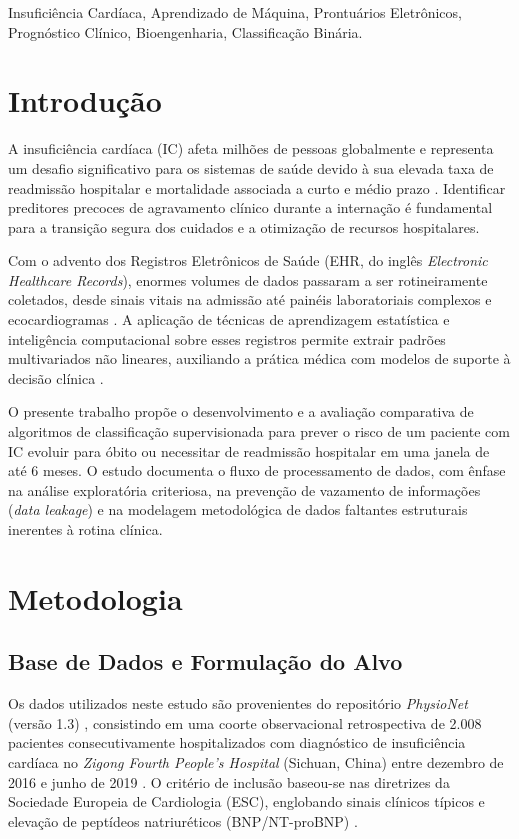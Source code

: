 \documentclass[conference]{IEEEtran}
\begin{document}
\begin{IEEEkeywords}
Insuficiência Cardíaca, Aprendizado de Máquina, Prontuários Eletrônicos, Prognóstico Clínico, Bioengenharia, Classificação Binária.
\end{IEEEkeywords}

\section{Introdução}
A insuficiência cardíaca (IC) afeta milhões de pessoas globalmente e representa um desafio significativo para os sistemas de saúde devido à sua elevada taxa de readmissão hospitalar e mortalidade associada a curto e médio prazo \cite{b3}. Identificar preditores precoces de agravamento clínico durante a internação é fundamental para a transição segura dos cuidados e a otimização de recursos hospitalares.

Com o advento dos Registros Eletrônicos de Saúde (EHR, do inglês \textit{Electronic Healthcare Records}), enormes volumes de dados passaram a ser rotineiramente coletados, desde sinais vitais na admissão até painéis laboratoriais complexos e ecocardiogramas \cite{b2}. A aplicação de técnicas de aprendizagem estatística e inteligência computacional sobre esses registros permite extrair padrões multivariados não lineares, auxiliando a prática médica com modelos de suporte à decisão clínica \cite{b4}.

O presente trabalho propõe o desenvolvimento e a avaliação comparativa de algoritmos de classificação supervisionada para prever o risco de um paciente com IC evoluir para óbito ou necessitar de readmissão hospitalar em uma janela de até 6 meses. O estudo documenta o fluxo de processamento de dados, com ênfase na análise exploratória criteriosa, na prevenção de vazamento de informações (\textit{data leakage}) e na modelagem metodológica de dados faltantes estruturais inerentes à rotina clínica.

\section{Metodologia}

\subsection{Base de Dados e Formulação do Alvo}
Os dados utilizados neste estudo são provenientes do repositório \textit{PhysioNet} (versão 1.3) \cite{b1}, consistindo em uma coorte observacional retrospectiva de 2.008 pacientes consecutivamente hospitalizados com diagnóstico de insuficiência cardíaca no \textit{Zigong Fourth People's Hospital} (Sichuan, China) entre dezembro de 2016 e junho de 2019 \cite{b2}. O critério de inclusão baseou-se nas diretrizes da Sociedade Europeia de Cardiologia (ESC), englobando sinais clínicos típicos e elevação de peptídeos natriuréticos (BNP/NT-proBNP) \cite{b3}.
\end{document}
